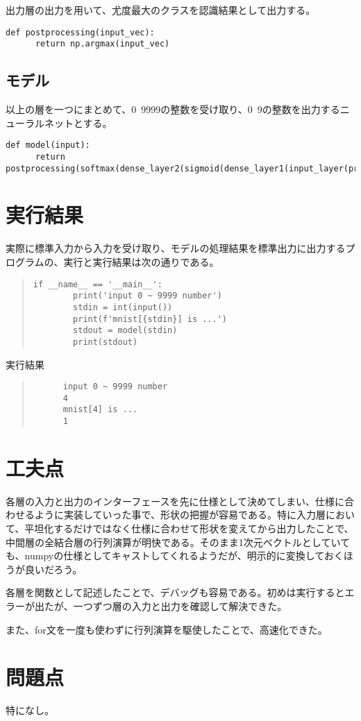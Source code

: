 \documentclass[platex,dvipdfmx]{jsarticle}
\begin{document}
  出力層の出力を用いて、尤度最大のクラスを認識結果として出力する。

  \begin{lstlisting}[caption=ex1.py, label=postprocessing]
    def postprocessing(input_vec):
      return np.argmax(input_vec)
  \end{lstlisting}

  \subsection{モデル}

  以上の層を一つにまとめて、0~9999の整数を受け取り、0~9の整数を出力するニューラルネットとする。

  \begin{lstlisting}[caption=ex1.py, label=model]
    def model(input):
      return postprocessing(softmax(dense_layer2(sigmoid(dense_layer1(input_layer(preprocessing(input)))))))
  \end{lstlisting}

  \section{実行結果}

  実際に標準入力から入力を受け取り、モデルの処理結果を標準出力に出力するプログラムの、実行と実行結果は次の通りである。

  \begin{quote}
    \begin{lstlisting}[caption=ex1.py, label=main]
      if __name__ == '__main__':  
        print('input 0 ~ 9999 number')
        stdin = int(input())
        print(f'mnist[{stdin}] is ...')
        stdout = model(stdin)
        print(stdout)
    \end{lstlisting}
  \end{quote}

  実行結果

  \begin{quote}
    \begin{verbatim}
      input 0 ~ 9999 number
      4
      mnist[4] is ...
      1
    \end{verbatim}
  \end{quote}

  \section{工夫点}

  各層の入力と出力のインターフェースを先に仕様として決めてしまい、仕様に合わせるように実装していった事で、形状の把握が容易である。特に入力層において、平坦化するだけではなく仕様に合わせて形状を変えてから出力したことで、中間層の全結合層の行列演算が明快である。そのまま1次元ベクトルとしていても、numpyの仕様としてキャストしてくれるようだが、明示的に変換しておくほうが良いだろう。

  各層を関数として記述したことで、デバッグも容易である。初めは実行するとエラーが出たが、一つずつ層の入力と出力を確認して解決できた。

  また、for文を一度も使わずに行列演算を駆使したことで、高速化できた。

  \section{問題点}

  特になし。
\end{document}
